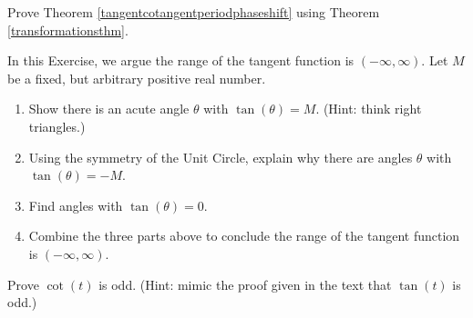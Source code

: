 \documentclass{ximera}
\begin{document}
\begin{problem}\label{sinusoidformtancotexercise}
    Prove Theorem \ref{tangentcotangentperiodphaseshift} using Theorem \ref{transformationsthm}. 
\end{problem}

\begin{problem}\label{rangeoftangentexercise}
    
  In this Exercise, we argue the range of the tangent function is $(-\infty, \infty)$.  Let $M$ be a fixed, but arbitrary positive real number.

\begin{enumerate}

\item Show there is an acute  angle $\theta$ with $\tan(\theta)  = M$.  (Hint: think right triangles.) 

\item  Using the symmetry of the Unit Circle, explain why there are angles $\theta$ with $\tan(\theta) = -M$.

\item  Find angles with $\tan(\theta) = 0$.

\item  Combine the three parts above to conclude the range of the tangent function is $(-\infty, \infty)$.

\end{enumerate}

\end{problem}

\begin{problem}\label{cotisoddexercise}
    Prove $\cot(t)$ is odd.  (Hint:  mimic the proof given in the text that $\tan(t)$ is odd.)
\end{problem}
  
\end{document}
